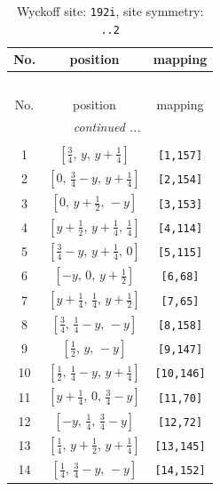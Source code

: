 \documentclass[fleqn,8pt]{jsarticle}
\begin{document}
\begin{longtable}{ccc}
\caption{Wyckoff site: {\tt 192i}, site symmetry: {\tt ..2}}
 \\
 \hline \hline
No. & position & mapping \\ \hline \endfirsthead

\multicolumn{2}{l}{\tablename\ \thetable{}} \\
 \hline \hline
No. & position & mapping \\ \hline \endhead

 \hline \hline
\multicolumn{2}{r}{\footnotesize\it continued ...} \\ \endfoot

 \hline \hline
\multicolumn{2}{r}{} \\ \endlastfoot

1 & $\left[ \frac{3}{4},\, y,\, y + \frac{1}{4} \right]$ & {\tt [1,157]} \\ \hline
2 & $\left[ 0,\, \frac{3}{4} - y,\, y + \frac{1}{4} \right]$ & {\tt [2,154]} \\ \hline
3 & $\left[ 0,\, y + \frac{1}{2},\, - y \right]$ & {\tt [3,153]} \\ \hline
4 & $\left[ y + \frac{1}{2},\, y + \frac{1}{4},\, \frac{1}{4} \right]$ & {\tt [4,114]} \\ \hline
5 & $\left[ \frac{3}{4} - y,\, y + \frac{1}{4},\, 0 \right]$ & {\tt [5,115]} \\ \hline
6 & $\left[ - y,\, 0,\, y + \frac{1}{2} \right]$ & {\tt [6,68]} \\ \hline
7 & $\left[ y + \frac{1}{4},\, \frac{1}{4},\, y + \frac{1}{2} \right]$ & {\tt [7,65]} \\ \hline
8 & $\left[ \frac{3}{4},\, \frac{1}{4} - y,\, - y \right]$ & {\tt [8,158]} \\ \hline
9 & $\left[ \frac{1}{2},\, y,\, - y \right]$ & {\tt [9,147]} \\ \hline
10 & $\left[ \frac{1}{2},\, \frac{1}{4} - y,\, y + \frac{1}{4} \right]$ & {\tt [10,146]} \\ \hline
11 & $\left[ y + \frac{1}{4},\, 0,\, \frac{3}{4} - y \right]$ & {\tt [11,70]} \\ \hline
12 & $\left[ - y,\, \frac{1}{4},\, \frac{3}{4} - y \right]$ & {\tt [12,72]} \\ \hline
13 & $\left[ \frac{1}{4},\, y + \frac{1}{2},\, y + \frac{1}{4} \right]$ & {\tt [13,145]} \\ \hline
14 & $\left[ \frac{1}{4},\, \frac{3}{4} - y,\, - y \right]$ & {\tt [14,152]} \\ \hline

\end{longtable}
\end{document}
